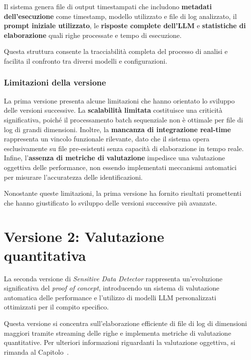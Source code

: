 \documentclass[12pt,twoside]{report}
\begin{document}
Il sistema genera file di output timestampati che includono \textbf{metadati dell'esecuzione} come timestamp, modello utilizzato e file di log analizzato, il \textbf{prompt iniziale utilizzato}, le \textbf{risposte complete dell'LLM} e \textbf{statistiche di elaborazione} quali righe processate e tempo di esecuzione.

Questa struttura consente la tracciabilità completa del processo di analisi e facilita il confronto tra diversi modelli e configurazioni.

\subsubsection{Limitazioni della versione}
\label{subsubsec:ver1_limitazioni}

La prima versione presenta alcune limitazioni che hanno orientato lo sviluppo delle versioni successive. La \textbf{scalabilità limitata} costituisce una criticità significativa, poiché il processamento batch sequenziale non è ottimale per file di log di grandi dimensioni. Inoltre, la \textbf{mancanza di integrazione real-time} rappresenta un vincolo funzionale rilevante, dato che il sistema opera esclusivamente su file pre-esistenti senza capacità di elaborazione in tempo reale. Infine, l'\textbf{assenza di metriche di valutazione} impedisce una valutazione oggettiva delle performance, non essendo implementati meccanismi automatici per misurare l'accuratezza delle identificazioni.

Nonostante queste limitazioni, la prima versione ha fornito risultati promettenti che hanno giustificato lo sviluppo delle versioni successive più avanzate.

\section{Versione 2: Valutazione quantitativa}
\label{sec:ver2}

La seconda versione di \textit{Sensitive Data Detector} rappresenta un'evoluzione significativa del \textit{proof of concept}, introducendo un sistema di valutazione automatica delle performance e l'utilizzo di modelli LLM personalizzati ottimizzati per il compito specifico.

Questa versione si concentra sull'elaborazione efficiente di file di log di dimensioni maggiori tramite streaming delle righe e implementa metriche di valutazione quantitative. Per ulteriori informazioni riguardanti la valutazione oggettiva, si rimanda al Capitolo~.
\end{document}
